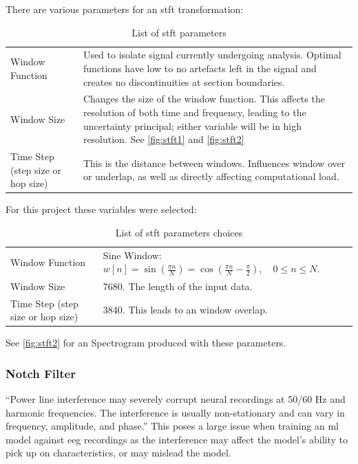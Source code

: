 \documentclass[12pt]{article}
\begin{document}
There are various parameters for an \acrshort{stft} transformation: 
\begin{table}[H]
\centering
\begin{tabular}{p{}p{}}
Window Function & Used to isolate signal currently undergoing analysis. Optimal functions have low to no artefacts left in the signal and creates no discontinuities at section boundaries.\\
Window Size & Changes the size of the window function. This affects the resolution of both time and frequency, leading to the uncertainty principal; either variable will be in high resolution. See \ref{fig:stft1} and \ref{fig:stft2} \\
Time Step (step size or hop size) & This is the distance between windows. Influences window over or underlap, as well as directly affecting computational load. \\                            
\end{tabular}
\caption{List of \acrfull{stft} parameters}
\label{tab:stft_params}
\end{table}

For this project these variables were selected:

\begin{table}[H]
\centering
\begin{tabular}{p{}p{}}
Window Function & Sine Window: $ w[n] = \sin\left(\frac{\pi n}{N}\right) = \cos\left(\frac{\pi n}{N} - \frac{\pi}{2}\right),\quad 0\le n \le N.$ \\
Window Size & 7680. The length of the input data. \\
Time Step (step size or hop size) & 3840. This leads to an window overlap. \\                            
\end{tabular}
\caption{List of \acrfull{stft} parameters choices}
\label{tab:stft_choices}
\end{table}

See \ref{fig:stft2} for an Spectrogram produced with these parameters. 

\subsubsection{Notch Filter}

``Power line interference may severely corrupt neural recordings at 50/60 Hz and harmonic frequencies. The interference is usually non-stationary and can vary in frequency, amplitude, and phase.'' \cite{keshtkaran2014fast} This poses a large issue when training an \acrshort{ml} model against \acrshort{eeg} recordings as the interference may affect the model's ability to pick up on characteristics, or may mislead the model.
\end{document}
